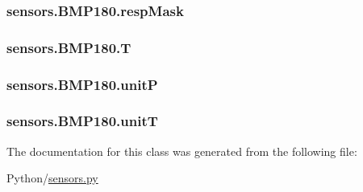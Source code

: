 \subsubsection[{\texorpdfstring{resp\+Mask}{respMask}}]{\setlength{\rightskip}{0pt plus 5cm}sensors.\+B\+M\+P180.\+resp\+Mask}\hypertarget{classsensors_1_1BMP180_a9c885621176fba2aa3760f16e7545fd7}{}\label{classsensors_1_1BMP180_a9c885621176fba2aa3760f16e7545fd7}
\subsubsection[{\texorpdfstring{T}{T}}]{\setlength{\rightskip}{0pt plus 5cm}sensors.\+B\+M\+P180.\+T}\hypertarget{classsensors_1_1BMP180_a2063dc8bbcdbe07979e3faf2f6e8eb7d}{}\label{classsensors_1_1BMP180_a2063dc8bbcdbe07979e3faf2f6e8eb7d}
\subsubsection[{\texorpdfstring{unitP}{unitP}}]{\setlength{\rightskip}{0pt plus 5cm}sensors.\+B\+M\+P180.\+unitP}\hypertarget{classsensors_1_1BMP180_a3646abe1f61aa50d15047f09588a2be1}{}\label{classsensors_1_1BMP180_a3646abe1f61aa50d15047f09588a2be1}
\subsubsection[{\texorpdfstring{unitT}{unitT}}]{\setlength{\rightskip}{0pt plus 5cm}sensors.\+B\+M\+P180.\+unitT}\hypertarget{classsensors_1_1BMP180_a954ddd1f76899d7d2b05aed669abd094}{}\label{classsensors_1_1BMP180_a954ddd1f76899d7d2b05aed669abd094}


The documentation for this class was generated from the following file\+:\begin{DoxyCompactItemize}
\item 
Python/\hyperlink{sensors_8py}{sensors.\+py}\end{DoxyCompactItemize}
